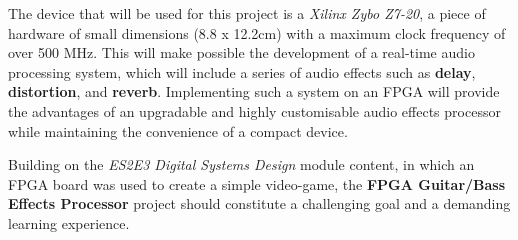 The device that will be used for this project is a \textit{Xilinx Zybo Z7-20}, a piece of hardware of small dimensions (8.8 x 12.2cm) with a maximum clock frequency of over 500 MHz. This will make possible the development of a real-time audio processing system, which will include a series of audio effects such as \textbf{delay}, \textbf{distortion}, and \textbf{reverb}. Implementing such a system on an FPGA will provide the advantages of an upgradable and highly customisable audio effects processor while maintaining the convenience of a compact device.

Building on the \textit{ES2E3 Digital Systems Design} module content, in which an FPGA board was used to create a simple video-game, the \textbf{FPGA Guitar/Bass Effects Processor} project should constitute a challenging goal and a demanding learning experience.